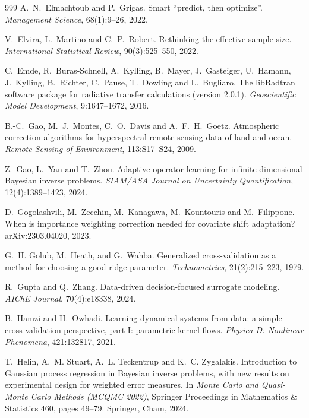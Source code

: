 \begin{thebibliography}{999}
A.~N.~Elmachtoub and P.~Grigas.
\newblock Smart ``predict, then optimize''.
\newblock \emph{Management Science}, 68(1):9--26, 2022.

V.~Elvira, L.~Martino and C.~P.~Robert.
\newblock Rethinking the effective sample size.
\newblock \emph{International Statistical Review}, 90(3):525--550, 2022.

C.~Emde, R.~Buras-Schnell, A.~Kylling, B.~Mayer, J.~Gasteiger, U.~Hamann, J.~Kylling, B.~Richter, C.~Pause,
T.~Dowling and L.~Bugliaro.
\newblock The {libRadtran} software package for radiative transfer calculations (version 2.0.1).
\newblock \emph{Geoscientific Model Development}, 9:1647--1672, 2016.

B.-C.~Gao, M.~J.~Montes, C.~O.~Davis and A.~F.~H.~Goetz.
\newblock Atmospheric correction algorithms for hyperspectral remote sensing data of land and ocean.
\newblock \emph{Remote Sensing of Environment}, 113:S17--S24, 2009.

Z.~Gao, L.~Yan and T.~Zhou.
\newblock Adaptive operator learning for infinite-dimensional Bayesian inverse problems.
\newblock \emph{SIAM/ASA Journal on Uncertainty Quantification}, 12(4):1389--1423, 2024.

D.~Gogolashvili, M.~Zecchin, M.~Kanagawa, M.~Kountouris and M.~Filippone.
\newblock When is importance weighting correction needed for covariate shift adaptation?
\newblock arXiv:2303.04020, 2023.

G.~H. Golub, M.~Heath, and G.~Wahba.
\newblock Generalized cross-validation as a method for choosing a good ridge parameter.
\newblock \emph{Technometrics}, 21(2):215--223, 1979.

R.~Gupta and Q.~Zhang.
\newblock Data-driven decision-focused surrogate modeling.
\newblock \emph{AIChE Journal}, 70(4):e18338, 2024.

B.~Hamzi and H.~Owhadi.
\newblock Learning dynamical systems from data: a simple cross-validation perspective, part I:
parametric kernel flows.
\newblock \emph{Physica D: Nonlinear Phenomena}, 421:132817, 2021.

T.~Helin, A.~M. Stuart, A.~L. Teckentrup and K.~C. Zygalakis.
\newblock Introduction to Gaussian process regression in Bayesian inverse problems, with new results on experimental
design for weighted error measures.
\newblock In \emph{Monte Carlo and Quasi-Monte Carlo Methods (MCQMC 2022)}, Springer Proceedings in Mathematics \&
Statistics 460, pages 49--79. Springer, Cham, 2024.


\end{thebibliography}
